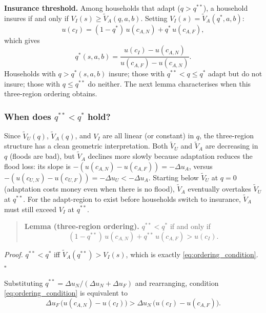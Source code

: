 \documentclass{article}
\begin{document}
\textbf{Insurance threshold.} Among households that adapt ($q > q^{**}$), a household insures if and only if $V_I(s) \geq \tilde{V}_A(q,a,b)$. Setting $V_I(s) = \tilde{V}_A(q^*,a,b)$:
\begin{equation}
    u(c_I) = (1-q^*)\,u(c_{A,N}) + q^*\,u(c_{A,F}), \label{eq:qstar_def}
\end{equation}
which gives
\begin{equation}
    q^*(s,a,b) = \frac{u(c_I)-u(c_{A,N})}{u(c_{A,F})-u(c_{A,N})}. \label{eq:qstar}
\end{equation}
Households with $q > q^*(s,a,b)$ insure; those with $q^{**} < q \leq q^*$ adapt but do not insure; those with $q \leq q^{**}$ do neither. The next lemma characterises when this three-region ordering obtains.

\subsubsection*{When does $q^{**} < q^*$ hold?}

Since $\tilde{V}_U(q)$, $\tilde{V}_A(q)$, and $V_I$ are all linear (or constant) in $q$, the three-region structure has a clean geometric interpretation. Both $\tilde{V}_U$ and $\tilde{V}_A$ are decreasing in $q$ (floods are bad), but $\tilde{V}_A$ declines more slowly because adaptation reduces the flood loss: its slope is $-(u(c_{A,N})-u(c_{A,F})) = -\Delta u_A$, versus $-(u(c_{U,N})-u(c_{U,F})) = -\Delta u_U < -\Delta u_A$. Starting below $\tilde{V}_U$ at $q=0$ (adaptation costs money even when there is no flood), $\tilde{V}_A$ eventually overtakes $\tilde{V}_U$ at $q^{**}$. For the adapt-region to exist before households switch to insurance, $\tilde{V}_A$ must still exceed $V_I$ at $q^{**}$.

\begin{quote}
\textbf{Lemma (three-region ordering).} $q^{**} < q^*$ if and only if
\begin{equation}
    (1-q^{**})\,u(c_{A,N}) + q^{**}\,u(c_{A,F}) > u(c_I). \label{eq:ordering_condition}
\end{equation}
\end{quote}

\textit{Proof.} $q^{**} < q^*$ iff $\tilde{V}_A(q^{**}) > V_I(s)$, which is exactly \eqref{eq:ordering_condition}. $\square$

Substituting $q^{**} = \Delta u_N/(\Delta u_N + \Delta u_F)$ and rearranging, condition \eqref{eq:ordering_condition} is equivalent to
\begin{equation}
    \Delta u_F\,\bigl(u(c_{A,N})-u(c_I)\bigr) > \Delta u_N\,\bigl(u(c_I)-u(c_{A,F})\bigr). \label{eq:ordering_condition2}
\end{equation}
\end{document}
